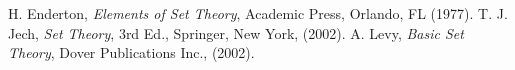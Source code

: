\documentclass[12pt]{article}
\begin{document}
\begin{thebibliography}{8}
 H. Enderton, {\em Elements of Set Theory}, Academic Press, Orlando, FL (1977).
 T. J. Jech, \emph{Set Theory}, 3rd Ed., Springer, New York, (2002).
 A. Levy, {\em Basic Set Theory}, Dover Publications Inc., (2002).
\end{thebibliography}
\end{document}
